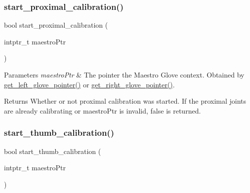 \subsubsection{\texorpdfstring{start\+\_\+proximal\+\_\+calibration()}{start\_proximal\_calibration()}}
{\footnotesize\ttfamily bool start\+\_\+proximal\+\_\+calibration (\begin{DoxyParamCaption}\item[{intptr\+\_\+t}]{maestro\+Ptr }\end{DoxyParamCaption})}


\begin{DoxyParams}{Parameters}
{\em maestro\+Ptr} & The pointer the Maestro Glove context. Obtained by \hyperlink{group__glove_management_ga63ce3c99d4a8b8db851b22af9185764e}{get\+\_\+left\+\_\+glove\+\_\+pointer()} or \hyperlink{group__glove_management_ga9b8fd9d91aeac3f8da50f7a7eba0c32b}{get\+\_\+right\+\_\+glove\+\_\+pointer()}. \\
\hline
\end{DoxyParams}
\begin{DoxyReturn}{Returns}
Whether or not proximal calibration was started. If the proximal joints are already calibrating or {\ttfamily maestro\+Ptr} is invalid, {\ttfamily false} is returned. 
\end{DoxyReturn}
\mbox{\label{group__glove_calibration_ga8d3e246642b4dbb70be016ad320cc320}} 
\subsubsection{\texorpdfstring{start\+\_\+thumb\+\_\+calibration()}{start\_thumb\_calibration()}}
{\footnotesize\ttfamily bool start\+\_\+thumb\+\_\+calibration (\begin{DoxyParamCaption}\item[{intptr\+\_\+t}]{maestro\+Ptr }\end{DoxyParamCaption})}


